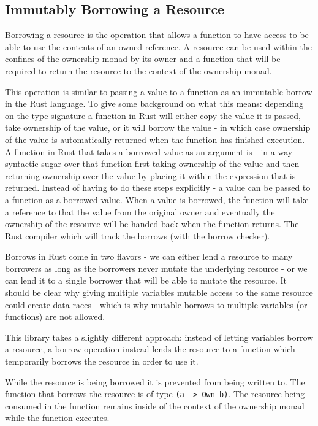 \documentclass[onehalf,11pt]{beavtex}
\begin{document}
\subsection{Immutably Borrowing a Resource}

Borrowing a resource is the operation that allows a function to have
access to be able to use the contents of an owned reference.
A resource can be used within the confines of the ownership monad by its owner
and a function that will be required to return the resource to the context of
the ownership monad.

This operation is similar to passing a value to a function as an immutable
borrow in the Rust language.  To give some background on what this means:
depending on the type signature a function in Rust will either copy the value
it is passed, take ownership of the value, or it will borrow the value - in
which case ownership of the value is automatically returned when the function
has finished execution.\cite{rust_book_ownership}
A function in Rust that takes a borrowed value as an argument is - in a way -
syntactic sugar over that function first taking ownership of the value and then
returning ownership over the value by placing it within the expression that is
returned.
Instead of having to do these steps explicitly - a value can be passed to a
function as a borrowed value.  When a value is borrowed, the function will take
a reference to that the value from the original owner and eventually the
ownership of the resource will be handed back when the function returns.
The Rust compiler which will track the borrows (with the borrow checker).

Borrows in Rust come in two flavors - we can either lend a resource to many
borrowers as long as the borrowers never mutate the underlying resource - or we
can lend it to a single borrower that will be able to mutate the
resource.\cite{rust_book_borrowing}
It should be clear why giving multiple variables mutable access to
the same resource could create data races - which is why mutable borrows to
multiple variables (or functions) are not allowed.

This library takes a slightly different approach: instead of letting variables
borrow a resource, a borrow operation instead lends the resource to a function
which temporarily borrows the resource in order to use it.

While the resource is being borrowed it is prevented from being written to.
The function that borrows the resource is of type \texttt{(a -> Own b)}. The
resource being consumed in the function remains inside of the context of the
ownership monad while the function executes.
\end{document}
